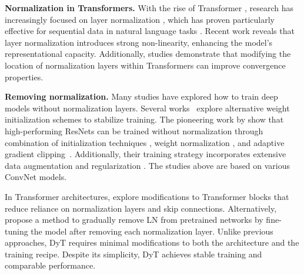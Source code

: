 \documentclass[]{fairmeta}
\renewcommand{\paragraph}[1]{\vspace{1.25mm}\noindent\textbf{#1}}
\begin{document}
\paragraph{Normalization in Transformers.} With the rise of Transformer \citep{vaswani2017attention}, research has increasingly focused on layer normalization \citep{ba2016layer}, which has proven particularly effective for sequential data in natural language tasks \citep{nguyen2019transformers, xu2019understanding, xiong2020layer}. 
Recent work \citep{ni2024nonlinearity} reveals that layer normalization introduces strong non-linearity, enhancing the model's representational capacity. Additionally, studies \citep{loshchilov2024ngpt, li2024mix} demonstrate that modifying the location of normalization layers within Transformers can improve convergence properties.


\paragraph{Removing normalization.}
Many studies have explored how to train deep models without normalization layers.
Several works~\citep{zhang2019fixup, de2020batch, bachlechner2021rezero} explore alternative weight initialization schemes to stabilize training.
The pioneering work by \citet{brock2021characterizing, brock2021high} show that high-performing ResNets can be trained without normalization \citep{smith2023convnets} through combination of initialization techniques \citep{de2020batch},  weight normalization \citep{salimans2016weight, huang2017centered, qiao2019micro}, and adaptive gradient clipping~\citep{brock2021high}. Additionally, their training strategy incorporates extensive data augmentation \citep{cubuk2020randaugment} and regularization \citep{srivastava2014dropout, huang2016deep}. The studies above are based on various ConvNet models.

In Transformer architectures, \citet{he2023simplifying} explore modifications to Transformer blocks that reduce reliance on normalization layers and skip connections. Alternatively, \citet{heimersheim2024you} propose a method to gradually remove LN from pretrained networks by fine-tuning the model after removing each normalization layer.
Unlike previous approaches, DyT requires minimal modifications to both the architecture and the training recipe. Despite its simplicity, DyT achieves stable training and comparable performance.
\end{document}
